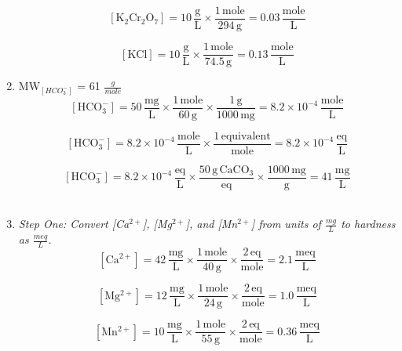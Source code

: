 \documentclass[12pt,letterpaper]{article}
\begin{document}
\begin{enumerate}
\begin{equation*}
\mathrm{[K_2Cr_2O_7] = 10\, \frac{g}{L}\times \frac{1 \, mole}{294\,g} = 0.03\, \frac{mole}{L}}
\end{equation*}

\begin{equation*}
\mathrm{[KCl] = 10\, \frac{g}{L}\times \frac{1 \, mole}{74.5\,g} = 0.13\, \frac{mole}{L}}
\end{equation*}

\item
MW$_{[HCO_3^-]}$ = 61 $\frac{g}{mole}$\\

\begin{equation*}
\mathrm{[HCO_3^-] = 50\, \frac{mg}{L}\times \frac{1 \, mole}{60\,g}\times \frac{1\, g}{1000\, mg} = 8.2\times 10^{-4}\, \frac{mole}{L}}
\end{equation*}

\begin{equation*}
\mathrm{[HCO_3^-] = 8.2\times 10^{-4}\, \frac{mole}{L}\times \frac{1\, equivalent}{mole} = 8.2\times 10^{-4}\, \frac{eq}{L}}
\end{equation*}

\begin{equation*}
\mathrm{[HCO_3^-] = 8.2\times 10^{-4}\, \frac{eq}{L}\times \frac{50\,g\, CaCO_3}{eq}\times \frac{1000 \, mg}{g} = 41\, \frac{mg}{L}}
\end{equation*}\\

\item
\emph{Step One:
Convert [Ca$^{2+}$], [Mg$^{2+}$], and [Mn$^{2+}$] from units of $\frac{mg}{L}$ to hardness as $\frac{meq}{L}$.}\\

\begin{equation*}
\mathrm{[Ca^{2+}] = 42\, \frac{mg}{L}\times \frac{1 \, mole}{40\,g}\times \frac{2\, eq}{mole} = 2.1 \, \frac{meq}{L}}
\end{equation*}

\begin{equation*}
\mathrm{[Mg^{2+}] = 12\, \frac{mg}{L}\times \frac{1 \, mole}{24\,g}\times \frac{2\, eq}{mole} = 1.0\, \frac{meq}{L}}
\end{equation*}

\begin{equation*}
\mathrm{[Mn^{2+}] = 10\, \frac{mg}{L}\times \frac{1 \, mole}{55\,g}\times \frac{2\, eq}{mole} = 0.36\, \frac{meq}{L}}
\end{equation*}\\


\end{enumerate}
\end{document}
